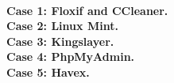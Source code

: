  \\

\noindent\textbf{Case 1: Floxif and CCleaner.}  \\

\noindent\textbf{Case 2: Linux Mint.}  \\

\noindent\textbf{Case 3: Kingslayer.}  \\

\noindent\textbf{Case 4: PhpMyAdmin.}  \\

\noindent\textbf{Case 5: Havex.}  \\
